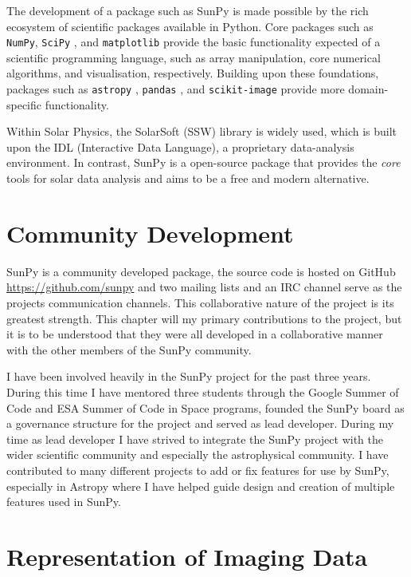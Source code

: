 \documentclass[a4paper,12pt,fourier,authoryear,custommargin]{Classes/PhDThesisPSnPDF}
\begin{document}
The development of a package such as SunPy is made possible by the rich ecosystem of scientific packages available in Python.
Core packages such as \texttt{NumPy}, 
\texttt{SciPy} \citep{jones2001}, and \texttt{matplotlib} \citep{hunter2007} provide the basic functionality expected of a scientific programming language, such as array manipulation, core numerical algorithms, and visualisation, respectively.
Building upon these foundations, packages such as \texttt{astropy} \citep[astronomy;][]{theastropycollaboration2013}, \texttt{pandas} \citep[time-series;][]{mckinney2012}, and \texttt{scikit-image} \citep[image processing;][]{vanderwalt2014} provide more domain-specific functionality.

Within Solar Physics, the SolarSoft (SSW) library \citep{freeland1998} is widely used, which is built upon the IDL (Interactive Data Language), a proprietary data-analysis environment. In contrast, SunPy is a open-source package that provides the \textit{core} tools for solar data analysis and aims to be a free and modern alternative.

\section{Community Development}
SunPy is a community developed package, the source code is hosted on GitHub \url{https://github.com/sunpy} and two mailing lists and an IRC channel serve as the projects communication channels.
This collaborative nature of the project is its greatest strength.
This chapter will my primary contributions to the project, but it is to be understood that they were all developed in a collaborative manner with the other members of the SunPy community.

I have been involved heavily in the SunPy project for the past three years.
During this time I have mentored three students through the Google Summer of Code and ESA Summer of Code in Space programs, founded the SunPy board as a governance structure for the project and served as lead developer.
During my time as lead developer I have strived to integrate the SunPy project with the wider scientific community and especially the astrophysical community.
I have contributed to many different projects to add or fix features for use by SunPy, especially in Astropy where I have helped guide design and creation of multiple features used in SunPy.

\section{Representation of Imaging Data}
\end{document}
